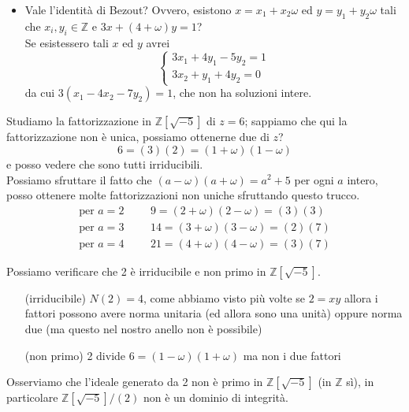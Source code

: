 \begin{esercizio}
\begin{itemize}
	\item Vale l'identità di Bezout? Ovvero, esistono $x=x_1+x_2\omega$ ed $y=y_1+y_2\omega$ tali che $x_i,y_i\in\mathbb{Z}$ e $3x+(4+\omega)y=1$?\\ Se esistessero tali $x$ ed $y$ avrei
	\begin{equation*}
		\begin{cases}
			3x_1+4y_1-5y_2=1\\
			3x_2+y_1+4y_2=0
		\end{cases}
	\end{equation*}
	da cui $3(x_1-4x_2-7y_2)=1$, che non ha soluzioni intere.
\end{itemize}
\end{esercizio}
\begin{esercizio}
	Studiamo la fattorizzazione in $\mathbb{Z}[\sqrt{-5}]$ di $z=6$; sappiamo che qui la fattorizzazione non è unica, possiamo ottenerne due di $z$?
	\begin{equation*}
	6 =(3)(2) =(1+\omega)(1-\omega)
	\end{equation*}
	e posso vedere che sono tutti irriducibili. \\ Possiamo sfruttare il fatto che $(a-\omega)(a+\omega)=a^2+5$ per ogni $a$ intero, posso ottenere molte fattorizzazioni non uniche sfruttando questo trucco.
	\begin{equation*}
		\begin{array}{lllr}
			\text{per $a=2$} & & &
				9=(2+\omega)(2-\omega)=(3)(3)\\
			\text{per $a=3$} & & &
				14=(3+\omega)(3-\omega)=(2)(7)\\
			\text{per $a=4$} & & &
				21=(4+\omega)(4-\omega)=(3)(7)		
		\end{array}
	\end{equation*}
\end{esercizio}
\begin{esercizio}
	Possiamo verificare che 2 è irriducibile e non primo in $\mathbb{Z}[\sqrt{-5}]$. 
	\begin{itemize}
		\item[(irriducibile)] $N(2)=4$, come abbiamo visto più volte se $2=xy$ allora i fattori possono avere norma unitaria (ed allora sono una unità) oppure norma due (ma questo nel nostro anello non è possibile)
		\item[(non primo)] 2 divide $6=(1-\omega)(1+\omega)$ ma non i due fattori
	\end{itemize}
Osserviamo che l'ideale generato da 2 non è primo in $\mathbb{Z}[\sqrt{-5}]$ (in $\mathbb{Z}$ sì), in particolare $\mathbb{Z}[\sqrt{-5}]/(2)$ non è un dominio di integrità.
\end{esercizio}




